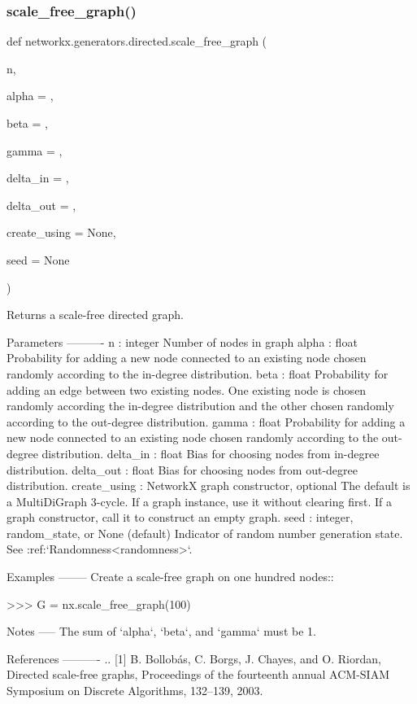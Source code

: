 \subsubsection{\texorpdfstring{scale\+\_\+free\+\_\+graph()}{scale\_free\_graph()}}
{\footnotesize\ttfamily def networkx.\+generators.\+directed.\+scale\+\_\+free\+\_\+graph (\begin{DoxyParamCaption}\item[{}]{n,  }\item[{}]{alpha = {},  }\item[{}]{beta = {},  }\item[{}]{gamma = {},  }\item[{}]{delta\+\_\+in = {},  }\item[{}]{delta\+\_\+out = {},  }\item[{}]{create\+\_\+using = {\ttfamily None},  }\item[{}]{seed = {\ttfamily None} }\end{DoxyParamCaption})}

\begin{DoxyVerb}Returns a scale-free directed graph.

Parameters
----------
n : integer
    Number of nodes in graph
alpha : float
    Probability for adding a new node connected to an existing node
    chosen randomly according to the in-degree distribution.
beta : float
    Probability for adding an edge between two existing nodes.
    One existing node is chosen randomly according the in-degree
    distribution and the other chosen randomly according to the out-degree
    distribution.
gamma : float
    Probability for adding a new node connected to an existing node
    chosen randomly according to the out-degree distribution.
delta_in : float
    Bias for choosing nodes from in-degree distribution.
delta_out : float
    Bias for choosing nodes from out-degree distribution.
create_using : NetworkX graph constructor, optional
    The default is a MultiDiGraph 3-cycle.
    If a graph instance, use it without clearing first.
    If a graph constructor, call it to construct an empty graph.
seed : integer, random_state, or None (default)
    Indicator of random number generation state.
    See :ref:`Randomness<randomness>`.

Examples
--------
Create a scale-free graph on one hundred nodes::

>>> G = nx.scale_free_graph(100)

Notes
-----
The sum of `alpha`, `beta`, and `gamma` must be 1.

References
----------
.. [1] B. Bollobás, C. Borgs, J. Chayes, and O. Riordan,
       Directed scale-free graphs,
       Proceedings of the fourteenth annual ACM-SIAM Symposium on
       Discrete Algorithms, 132--139, 2003.
\end{DoxyVerb}
 